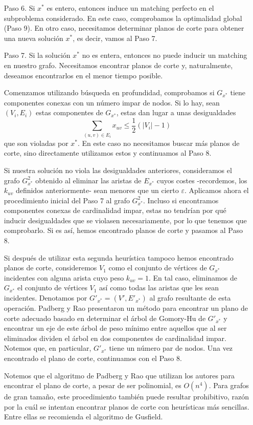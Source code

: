 \documentclass[twoside,a4paper,openright,12pt,tikz]{book}
\begin{document}
\begin{itemize}
\item[Paso 6.] Si $x^*$ es entero, entonces induce un matching perfecto en el subproblema considerado. En este caso, comprobamos la optimalidad global (Paso 9). En otro caso, necesitamos determinar planos de corte para obtener una nueva solución $x^*$, es decir, vamos al Paso 7.
\item[Paso 7.] Si la solución $x^*$ no es entera, entonces no puede inducir un matching en nuestro grafo. Necesitamos encontrar planos de corte y, naturalmente, deseamos encontrarlos en el menor tiempo posible.

Comenzamos utilizando búsqueda en profundidad, comprobamos si $G_{x^*}$ tiene componentes conexas con un número impar de nodos. Si lo hay, sean $(V_i,E_i)$ estas componentes de $G_{x^*}$, estas dan lugar a unas desigualdades
$$
\sum_{(u,v)\in E_i} x_{uv} \leq \frac{1}{2}(|V_i|-1)
$$ 
que son violadas por $x^*$. En este caso no necesitamos buscar más planos de corte, sino directamente utilizamos estos y continuamos al Paso 8.

Si nuestra solución no viola las desigualdades anteriores, consideramos el grafo $G^2_{x^*}$ obtenido al eliminar las aristas de $E_{x^*}$ cuyos costes -recordemos, los $k_{uv}$ definidos anteriormente- sean menores que un cierto $\varepsilon$. Aplicamos ahora el procedimiento inicial del Paso 7 al grafo $G^2_{x^*}$. Incluso si encontramos componentes conexas de cardinalidad impar, estas no tendrían por qué inducir desigualdades que se violasen necesariamente, por lo que tenemos que comprobarlo. Si es así, hemos encontrado planos de corte y pasamos al Paso 8. 

Si después de utilizar esta segunda heurística tampoco hemos encontrado planos de corte, consideremos $V_1$ como el conjunto de vértices de $G_{x^*}$ incidentes con alguna arista cuyo peso $k_{uv}=1$. En tal caso, eliminamos de $G_{x^*}$ el conjunto de vértices $V_1$ así como todas las aristas que les sean incidentes. Denotamos por $G'_{x^*} =(V',E'_{x^*})$ al grafo resultante de esta operación. Padberg y Rao presentaron un método para encontrar un plano de corte adecuado \cite{rao} basado en determinar el árbol de Gomory-Hu de $G'_{x^*}$ y encontrar un eje de este árbol de peso mínimo entre aquellos que al ser eliminados dividen el árbol en dos componentes de cardinalidad impar. Notemos que, en particular, $G'_{x^*}$ tiene un número par de nodos.
Una vez encontrado el plano de corte, continuamos con el Paso 8.

Notemos que el algoritmo de Padberg y Rao que utilizan los autores para encontrar el plano de corte, a pesar de ser polinomial, es $O(n^4)$. Para grafos de gran tamaño, este procedimiento también puede resultar prohibitivo, razón por la cuál se intentan encontrar planos de corte con heurísticas más sencillas. Entre ellas se recomienda el algoritmo de Gusfield.


\end{itemize}
\end{document}
